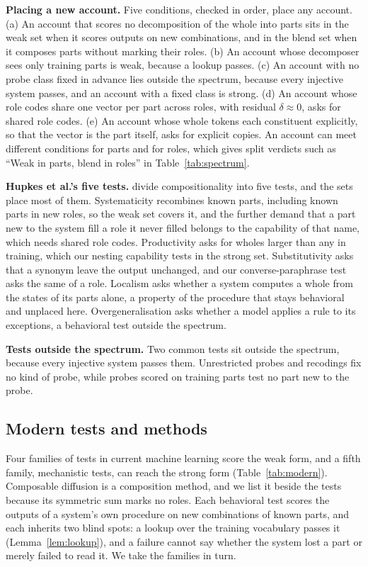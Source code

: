 \documentclass[10pt]{article}
\theoremstyle{plain}
\theoremstyle{remark}
\begin{document}
\textbf{Placing a new account.} Five conditions, checked in order, place any account. (a) An account that scores no decomposition of the whole into parts sits in the weak set when it scores outputs on new combinations, and in the blend set when it composes parts without marking their roles. (b) An account whose decomposer sees only training parts is weak, because a lookup passes. (c) An account with no probe class fixed in advance lies outside the spectrum, because every injective system passes, and an account with a fixed class is strong. (d) An account whose role codes share one vector per part across roles, with residual $\delta \approx 0$, asks for shared role codes. (e) An account whose whole tokens each constituent explicitly, so that the vector is the part itself, asks for explicit copies. An account can meet different conditions for parts and for roles, which gives split verdicts such as ``Weak in parts, blend in roles'' in Table~\ref{tab:spectrum}.

\textbf{Hupkes et al.'s five tests.} \citet{hupkes2020} divide compositionality into five tests, and the sets place most of them. Systematicity recombines known parts, including known parts in new roles, so the weak set covers it, and the further demand that a part new to the system fill a role it never filled belongs to the capability of that name, which needs shared role codes. Productivity asks for wholes larger than any in training, which our nesting capability tests in the strong set. Substitutivity asks that a synonym leave the output unchanged, and our converse-paraphrase test asks the same of a role. Localism asks whether a system computes a whole from the states of its parts alone, a property of the procedure that stays behavioral and unplaced here. Overgeneralisation asks whether a model applies a rule to its exceptions, a behavioral test outside the spectrum.

\textbf{Tests outside the spectrum.} Two common tests sit outside the spectrum, because every injective system passes them. Unrestricted probes and recodings fix no kind of probe, while probes scored on training parts test no part new to the probe.

\subsection{Modern tests and methods}
\label{sec:modern}

Four families of tests in current machine learning score the weak form, and a fifth family, mechanistic tests, can reach the strong form (Table~\ref{tab:modern}). Composable diffusion is a composition method, and we list it beside the tests because its symmetric sum marks no roles. Each behavioral test scores the outputs of a system's own procedure on new combinations of known parts, and each inherits two blind spots: a lookup over the training vocabulary passes it (Lemma~\ref{lem:lookup}), and a failure cannot say whether the system lost a part or merely failed to read it. We take the families in turn.
\end{document}
